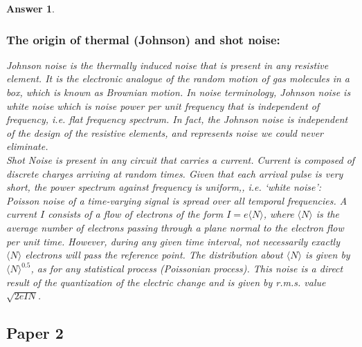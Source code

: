 \documentclass[a4paper]{article}
\newtheorem{ans}{Answer}[subsection]
\theoremstyle{new}
\begin{document}
\begin{ans}
\subsubsection*{The origin of thermal (Johnson) and shot noise:}
Johnson noise is the thermally induced noise that is present in any resistive element. It is the electronic analogue of the random motion of gas molecules in a box, which is known as Brownian motion. In noise terminology, Johnson noise is white noise which is noise power per unit frequency that is independent of frequency, i.e. flat frequency spectrum. In fact, the Johnson noise is independent of the design of the resistive elements, and represents noise we could never eliminate.\\[5pt]
Shot Noise is present in any circuit that carries a current. Current is composed of discrete charges arriving at random times. Given that each arrival pulse is very short, the power spectrum against frequency is uniform,, i.e. `white noise': Poisson noise of a time-varying signal is spread over all temporal frequencies. A current $I$ consists of a flow of electrons of the form $I=e\langle N\rangle$, where $\langle N\rangle$ is the average number of electrons passing through a plane normal to the electron flow per unit time. However, during any given time interval, not necessarily exactly $\langle N\rangle$ electrons will pass the reference point. The distribution about $\langle N\rangle$ is given by $\langle N\rangle^{0.5}$, as for any statistical process (Poissonian process). This noise is a direct result of the quantization of the electric change and is given by r.m.s. value $\sqrt{2eIN}$.
\end{ans}
\newpage
\subsection{Paper 2}
\end{document}
